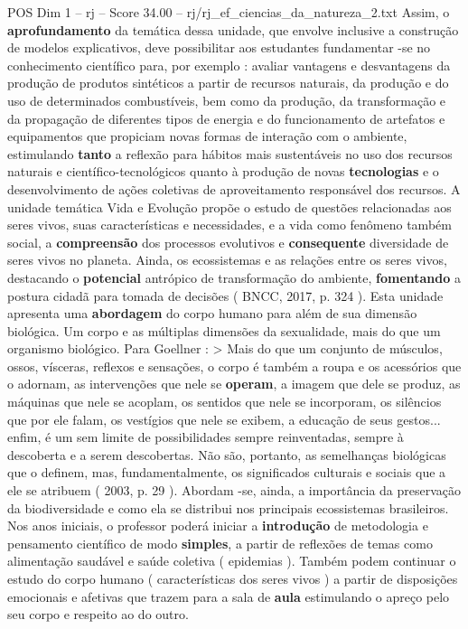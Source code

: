 \begin{textsample}{POS Dim 1 – rj – Score 34.00 – rj/rj\_ef\_ciencias\_da\_natureza\_2.txt}
Assim, o \textbf{aprofundamento} da temática dessa unidade, que envolve inclusive a construção de modelos explicativos, deve possibilitar aos estudantes fundamentar -se no conhecimento científico para, por exemplo : avaliar vantagens e desvantagens da produção de produtos sintéticos a partir de recursos naturais, da produção e do uso de determinados combustíveis, bem como da produção, da transformação e da propagação de diferentes tipos de energia e do funcionamento de artefatos e equipamentos que propiciam novas formas de interação com o ambiente, estimulando \textbf{tanto} a reflexão para hábitos mais sustentáveis no uso dos recursos naturais e científico-tecnológicos quanto à produção de novas \textbf{tecnologias} e o desenvolvimento de ações coletivas de aproveitamento responsável dos recursos.
A unidade temática Vida e Evolução propõe o estudo de questões relacionadas aos seres vivos, suas características e necessidades, e a vida como fenômeno também social, a \textbf{compreensão} dos processos evolutivos e \textbf{consequente} diversidade de seres vivos no planeta.
Ainda, os ecossistemas e as relações entre os seres vivos, destacando o \textbf{potencial} antrópico de transformação do ambiente, \textbf{fomentando} a postura cidadã para tomada de decisões ( BNCC, 2017, p. 324 ).
Esta unidade apresenta uma \textbf{abordagem} do corpo humano para além de sua dimensão biológica.
Um corpo e as múltiplas dimensões da sexualidade, mais do que um organismo biológico.
Para Goellner : > Mais do que um conjunto de músculos, ossos, vísceras, reflexos e sensações, o corpo é também a roupa e os acessórios que o adornam, as intervenções que nele se \textbf{operam}, a imagem que dele se produz, as máquinas que nele se acoplam, os sentidos que nele se incorporam, os silêncios que por ele falam, os vestígios que nele se exibem, a educação de seus gestos... enfim, é um sem limite de possibilidades sempre reinventadas, sempre à descoberta e a serem descobertas.
Não são, portanto, as semelhanças biológicas que o definem, mas, fundamentalmente, os significados culturais e sociais que a ele se atribuem ( 2003, p. 29 ).
Abordam -se, ainda, a importância da preservação da biodiversidade e como ela se distribui nos principais ecossistemas brasileiros.
Nos anos iniciais, o professor poderá iniciar a \textbf{introdução} de metodologia e pensamento científico de modo \textbf{simples}, a partir de reflexões de temas como alimentação saudável e saúde coletiva ( epidemias ).
Também podem continuar o estudo do corpo humano ( características dos seres vivos ) a partir de disposições emocionais e afetivas que trazem para a sala de \textbf{aula} estimulando o apreço pelo seu corpo e respeito ao do outro.

\end{textsample}
